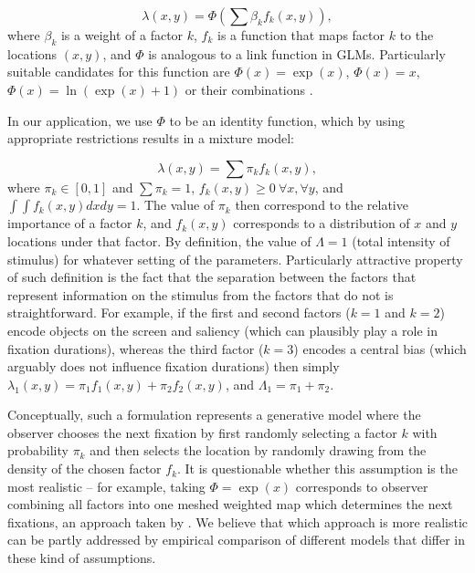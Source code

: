 \documentclass{article}
\begin{document}
\begin{equation}
    \lambda(x, y) = \Phi \left(\sum \beta_k f_k(x, y) \right),
\end{equation}
where $\beta_k$ is a weight of a factor $k$, $f_k$ is a function that maps factor $k$ to the locations $(x, y)$, and $\Phi$ is analogous to a link function in GLMs. Particularly suitable candidates for this function are $\Phi (x) = \exp(x)$, $\Phi (x) = x$, $\Phi (x) = \ln(\exp(x) + 1)$ or their combinations \citep[see ][for the discussion of the differences between them]{barthelme2013spatial}. 

In our application, we use $\Phi$ to be an identity function, which by using appropriate restrictions results in a mixture model:

\begin{equation}
\label{eq:lambdaMixture}
    \lambda(x, y) = \sum \pi_k f_k(x, y),
\end{equation}
where $\pi_k \in [0, 1]$ and $\sum \pi_k = 1$, $f_k(x, y) \geq 0~\forall x, \forall y$, and $\int \int f_k(x, y) dx dy = 1$. The value of $\pi_k$ then correspond to the relative importance of a factor $k$, and $f_k(x, y)$ corresponds to a distribution of $x$ and $y$ locations under that factor. By definition, the value of $\Lambda = 1$ (total intensity of stimulus) for whatever setting of the parameters. Particularly attractive property of such definition is the fact that the separation between the factors that represent information on the stimulus from the factors that do not is straightforward. For example, if the first and second factors ($k=1$ and $k=2$) encode objects on the screen and saliency (which can plausibly play a role in fixation durations), whereas the third factor ($k=3$) encodes a central bias (which arguably does not influence fixation durations) then simply $\lambda_1(x, y) = \pi_1 f_1(x, y) + \pi_2 f_2(x, y)$, and $\Lambda_1 = \pi_1 + \pi_2$.

Conceptually, such a formulation represents a generative model where the observer chooses the next fixation by first randomly selecting a factor $k$ with probability $\pi_k$ and then selects the location by randomly drawing from the density of the chosen factor $f_k$. It is questionable whether this assumption is the most realistic -- for example, taking $\Phi = \exp(x)$ corresponds to observer combining all factors into one meshed weighted map which determines the next fixations, an approach taken by \citet{barthelme2013spatial}. We believe that which approach is more realistic can be partly addressed by empirical comparison of different models that differ in these kind of assumptions.
\end{document}
